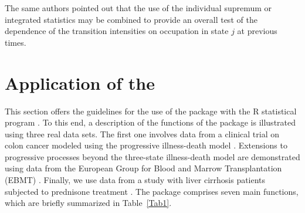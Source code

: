 


The same authors pointed out that the use of the individual supremum or integrated statistics may be combined to provide an overall test of the dependence of the transition intensities on occupation in state $j$ at previous times. 




\section[Application of the markovMSM]{Application of the } \label{sec: package}

This section offers the guidelines for the use of the  package with the R statistical program \citep{R}. To this end, a description of the functions of the package is illustrated using three real data sets. The first one involves data from a clinical trial on colon cancer modeled using the progressive illness-death model \citep{Moertel1995}. Extensions to progressive processes beyond the three-state illness-death model are demonstrated using data from the European Group for Blood and Marrow Transplantation (EBMT) \citep{Putter2007}. Finally, we use data from a study with liver cirrhosis patients subjected to prednisone treatment \citep{Andersen1993}. The package comprises seven main functions, which are briefly summarized in Table~\ref{Tab1}.  

